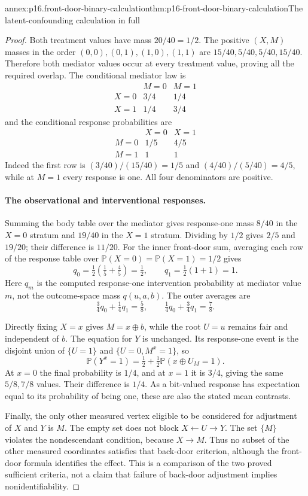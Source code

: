 \begin{annexitem}{annex:p16.front-door-binary-calculation}{thm:p16-front-door-binary-calculation}{The latent-confounding calculation in full}
\begin{proof}
Both treatment values have mass \(20/40=1/2\). The positive
\((X,M)\) masses in the order \((0,0),(0,1),(1,0),(1,1)\)
are \(15/40,5/40,5/40,15/40\). Therefore both mediator values
occur at every treatment value, proving all the required overlap.
The conditional mediator law is
\[
\begin{array}{c|cc}
 &M=0&M=1\\\hline
 X=0&3/4&1/4\\
 X=1&1/4&3/4
\end{array}
\]
and the conditional response probabilities are
\[
\begin{array}{c|cc}
 &X=0&X=1\\\hline
 M=0&1/5&4/5\\
 M=1&1&1
\end{array}
\]
Indeed the first row is \((3/40)/(15/40)=1/5\) and
\((4/40)/(5/40)=4/5\), while at \(M=1\) every response is one.
All four denominators are positive.

\paragraph{The observational and interventional responses.}
Summing the body table over the mediator gives response-one mass
\(8/40\) in the \(X=0\) stratum and \(19/40\) in the
\(X=1\) stratum. Dividing by \(1/2\) gives \(2/5\) and
\(19/20\); their difference is \(11/20\).
For the inner front-door sum, averaging each row of the response
table over \(\mathbb P(X=0)=\mathbb P(X=1)=1/2\) gives
\[
 q_0=\tfrac12(\tfrac15+\tfrac45)=\tfrac12,
 \qquad q_1=\tfrac12(1+1)=1.
\]
Here \(q_m\) is the computed response-one intervention probability
at mediator value \(m\), not the outcome-space mass \(q(u,a,b)\).
The outer averages are
\[
 \tfrac34 q_0+\tfrac14 q_1=\tfrac58,\qquad
 \tfrac14 q_0+\tfrac34 q_1=\tfrac78.
\]

Directly fixing \(X=x\) gives \(M=x\oplus b\), while the
root \(U=u\) remains fair and independent of \(b\). The equation
for \(Y\) is unchanged. Its response-one event is the disjoint
union of \(\{U=1\}\) and \(\{U=0,M^x=1\}\), so
\[
 \mathbb P(Y^x=1)
   =\tfrac12+\tfrac12\mathbb P(x\oplus U_M=1).
\]
At \(x=0\) the final probability is \(1/4\), and at \(x=1\)
it is \(3/4\), giving the same \(5/8,7/8\) values. Their
difference is \(1/4\). As a bit-valued response has expectation
equal to its probability of being one, these are also the stated
mean contrasts.

Finally, the only other measured vertex eligible to be considered
for adjustment of \(X\) and \(Y\) is \(M\). The empty set
does not block \(X\leftarrow U\to Y\). The set \(\{M\}\)
violates the nondescendant condition, because \(X\to M\).
Thus no subset of the other measured coordinates satisfies that
back-door criterion, although the front-door formula identifies the
effect. This is a comparison of the two proved sufficient criteria,
not a claim that failure of back-door adjustment implies
nonidentifiability.
\end{proof}
\end{annexitem}


